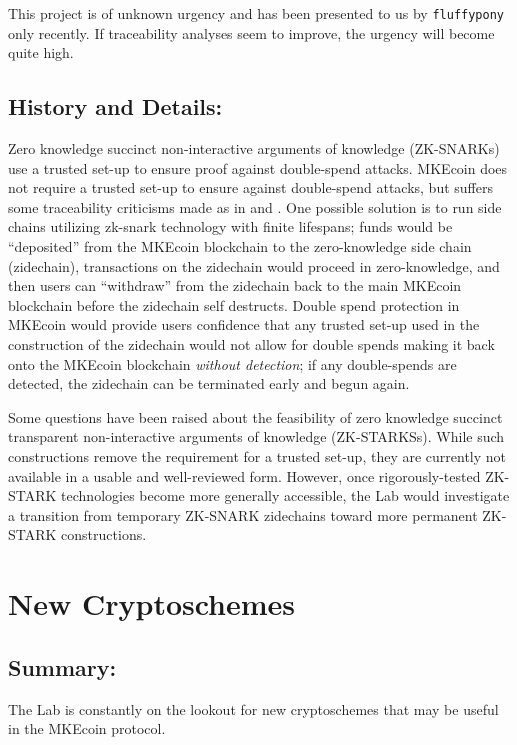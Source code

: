 \documentclass[12pt,english]{mrl}
\theoremstyle{definition}
\numberwithin{equation}{section}
\numberwithin{figure}{section}
\numberwithin{equation}{section}
\numberwithin{equation}{section}
\numberwithin{figure}{section}
\begin{document}
This project is of unknown urgency and has been presented to us by \texttt{fluffypony} only recently. If traceability analyses seem to improve, the urgency will become quite high.

\subsection{History and Details:} 

Zero knowledge succinct non-interactive arguments of knowledge (ZK-SNARKs) use a trusted set-up to ensure proof against double-spend attacks. MKEcoin does not require a trusted set-up to ensure against double-spend attacks, but suffers some traceability criticisms made as in \cite{miller2017empirical} and \cite{kumar2017traceability}. One possible solution is to run side chains utilizing zk-snark technology with finite lifespans; funds would be ``deposited'' from the MKEcoin blockchain to the zero-knowledge side chain (zidechain), transactions on the zidechain would proceed in zero-knowledge, and then users can ``withdraw'' from the zidechain back to the main MKEcoin blockchain before the zidechain self destructs. Double spend protection in MKEcoin would provide users confidence that any trusted set-up used in the construction of the zidechain would not allow for double spends making it back onto the MKEcoin blockchain \textit{without detection}; if any double-spends are detected, the zidechain can be terminated early and begun again.

Some questions have been raised about the feasibility of zero knowledge succinct transparent non-interactive arguments of knowledge (ZK-STARKSs). While such constructions remove the requirement for a trusted set-up, they are currently not available in a usable and well-reviewed form. However, once rigorously-tested ZK-STARK technologies become more generally accessible, the Lab would investigate a transition from temporary ZK-SNARK zidechains toward more permanent ZK-STARK constructions.



\section{New Cryptoschemes}


\subsection{Summary:} 

The Lab is constantly on the lookout for new cryptoschemes that may be useful in the MKEcoin protocol.
\end{document}
